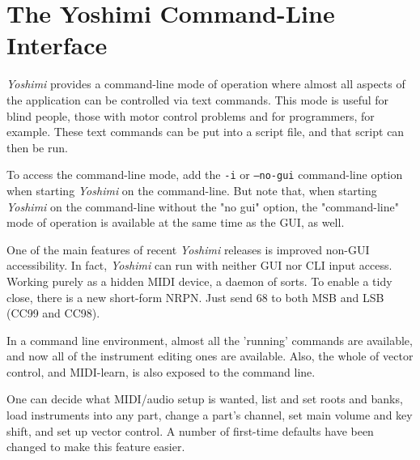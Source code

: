 %
%
%

\section{The Yoshimi Command-Line Interface}
\label{sec:command_line}

   \textsl{Yoshimi} provides a command-line mode of operation where almost
   all aspects of the application can be controlled via text commands.
   This mode is useful for blind people, those with motor control problems
   and for programmers, for example.
   These text commands can be put into a script file, and that script can then
   be run.

   To access the command-line mode,
   add the \texttt{-i} or \texttt{--no-gui} command-line
   option when starting \textsl{Yoshimi} on the command-line.  But note that,
   when starting \textsl{Yoshimi} on the command-line without the "no gui"
   option, the "command-line" mode
   of operation is available at the same time as the GUI, as well.

   One of the main features of recent \textsl{Yoshimi} releases
   is improved non-GUI accessibility.  In fact,
   \textsl{Yoshimi} can run with neither GUI nor CLI input access. Working
   purely as a hidden MIDI device, a daemon of sorts. To enable a tidy close,
   there is a new short-form NRPN. Just send 68 to both MSB and LSB (CC99 and
   CC98).

   In a command line environment, almost all the 'running' commands are
   available, and now all of the instrument editing ones are available.
   Also, the whole of vector control, and MIDI-learn, is also exposed
   to the command line.

   One can decide what MIDI/audio setup is wanted, list and set roots and
   banks, load instruments into any part, change a part's channel, set main
   volume and key shift, and set up vector control.  A number of first-time
   defaults have been changed to make this feature easier.

